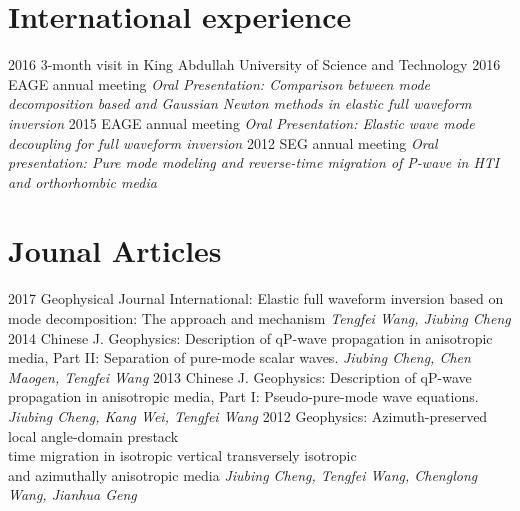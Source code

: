 \documentclass[]{friggeri-encvblackwhite}
\begin{document}
\section{International experience}
\begin{entrylist}
  \entry
    {2016}
    {3-month visit in King Abdullah University of Science and Technology}
	{\emph{
	}}
  \entry
    {2016}
    {EAGE annual meeting}
	{\emph{Oral Presentation: Comparison between mode decomposition based and Gaussian Newton methods in
		elastic full waveform inversion
	}}
  \entry
    {2015}
    {EAGE annual meeting}
	{\emph{Oral Presentation: 
		Elastic wave mode decoupling for full waveform inversion
	}}
  \entry
    {2012}
    {SEG annual meeting}
	{\emph{Oral presentation: Pure mode modeling and reverse-time migration of P-wave in
		HTI and orthorhombic media
	}}
\end{entrylist}
\section{Jounal Articles}
\begin{entrylist}
  \entry
    {2017}
	{Geophysical Journal International: Elastic full waveform inversion based on mode
		decomposition: The approach and	mechanism 
	}
	{\emph{Tengfei Wang, Jiubing Cheng}}
  \entry
    {2014}
	{Chinese J. Geophysics: Description of qP-wave propagation in anisotropic media, 
		Part II: Separation of pure-mode scalar waves.}
	{\emph{Jiubing Cheng, Chen Maogen, Tengfei Wang}}
  \entry
    {2013}
	{Chinese J. Geophysics: Description of qP-wave propagation in anisotropic media, 
		Part I: Pseudo-pure-mode wave equations.}
	{\emph{Jiubing Cheng, Kang Wei, Tengfei Wang}}
  \entry
    {2012}
    {Geophysics: Azimuth-preserved local angle-domain prestack \\
    time migration in isotropic vertical transversely isotropic\\
    and azimuthally anisotropic media}
    {\emph{Jiubing Cheng, Tengfei Wang, Chenglong Wang, Jianhua Geng}}
\end{entrylist}
\end{document}
